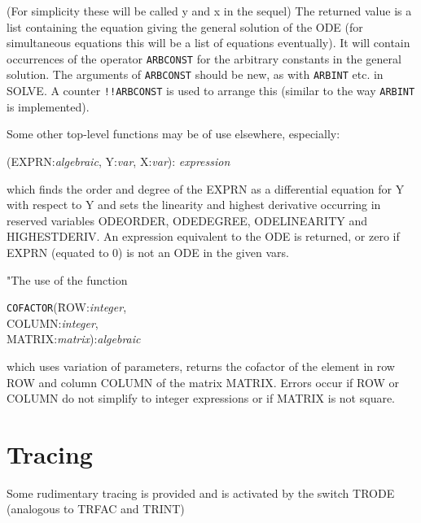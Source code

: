 \noindent (For simplicity these will be called y and x in the sequel)
The returned value is a list containing the equation giving the
general solution of the ODE (for simultaneous equations this will be a
list of equations eventually). It will contain occurrences of the
operator {\tt ARBCONST} for the arbitrary constants in the general solution.
The arguments of {\tt ARBCONST} should be new, as with {\tt ARBINT} etc.
in SOLVE. A counter {\tt !!ARBCONST} is used to arrange this (similar to the
way {\tt ARBINT} is implemented).

Some other top-level functions may be of use elsewhere, especially:

\vspace{.1in}
(EXPRN:{\em algebraic}, Y:{\em var}, X:{\em var}):
{\em expression}
\vspace{.1in}

\noindent which finds the order and degree of the EXPRN as a differential
equation for Y with respect to Y and sets the linearity and highest
derivative occurring in reserved variables ODEORDER, ODEDEGREE,
  
ODELINEARITY and HIGHESTDERIV. An expression equivalent to the ODE is
returned, or zero if EXPRN (equated to 0) is not an ODE in the
given vars.

"The use of the function

\vspace{.1in}
\begin{tabbing}
{\tt COFACTOR}(\=ROW:{\em integer}, \\
\>COLUMN:{\em integer}, \\
\>MATRIX:{\em matrix}):{\em algebraic}
\end{tabbing}
\vspace{.1in}

\noindent which uses variation of parameters, returns the cofactor of the
element in row ROW and column COLUMN of the matrix MATRIX.  Errors occur
if ROW or COLUMN do not simplify to integer expressions or if MATRIX is
not square.

\section{Tracing}


Some rudimentary tracing is provided and is activated by the switch TRODE
(analogous to TRFAC and TRINT)

